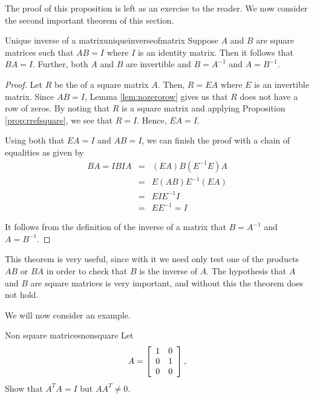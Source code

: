 The proof of this proposition is left as an exercise to the reader. 
We now consider the second important theorem of this section. 

\begin{theorem}{Unique inverse of a matrix}{uniqueinverseofmatrix}
Suppose $A$ and $B$ are square matrices such that $AB=I$ where $I$ is an identity matrix. Then it follows that $BA=I$. Further, both $A$ and $B$ are invertible and $B=A^{-1}$ and $A=B^{-1}$.
\end{theorem}

\begin{proof}
Let $R$ be the {\rref} of a square matrix $A$. Then, $R=EA$ where $E$ is an invertible matrix. Since $AB=I$, Lemma \ref{lem:nozerorow} gives us that $R$ does not have a row of zeros. By noting that $R$ is a square matrix and applying Proposition \ref{prop:rrefsquare}, we see that $R=I$. Hence, $EA=I$. 

Using both that $EA=I$ and $AB=I$, we can finish the proof with a chain of equalities as given by
\begin{eqnarray*}
BA = IBIA &=& (EA)B(E^{-1}E)A \\
&=& E(AB)E^{-1}(EA) \\
&=& EIE^{-1}I \\
&=& EE^{-1} = I
\end{eqnarray*}

It follows from the definition of the inverse of a matrix that $B=A^{-1}$ and $A=B^{-1}$.
\end{proof}

This theorem is very useful, since with it we need only test one of the products $AB$ or $BA$ in order to check that $B$ is the inverse of $A$. The hypothesis that $A$ and $B$ are square matrices is very important, and without this the theorem does not hold.

We will now consider an example.

\begin{example}{Non square matrices}{nonsquare}
Let 
\begin{equation*}
A =
\left[
\begin{array}{rr}
1 & 0 \\
0 & 1 \\
0 & 0 
\end{array}
\right],
\end{equation*}
Show that $A^{T}A = I$ but $AA^{T} \neq 0$. 
\end{example}

